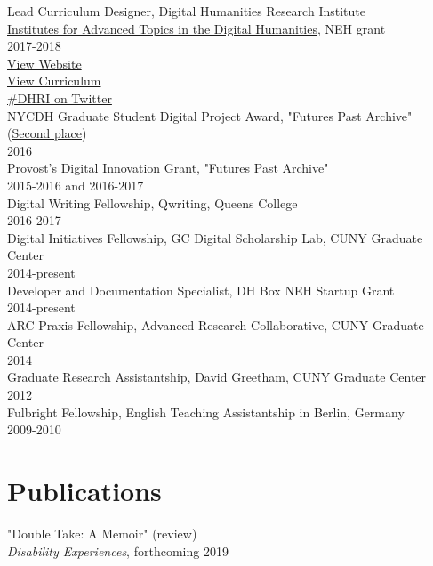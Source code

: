 \documentclass[11pt]{article}
\begin{document}
Lead Curriculum Designer, Digital Humanities Research Institute\\
\href{https://www.neh.gov/grants/odh/institutes-advanced-topics-in-the-digital-humanities}{Institutes for Advanced Topics in the Digital Humanities}, NEH grant\\
2017-2018\\
\href{http://dhinstitutes.org}{View Website}\\
\href{https://github.com/DHRI-Curriculum}{View Curriculum}\\
\href{https://twitter.com/search?q=\%2523dhri&src=tyah}{\#DHRI on Twitter}\\

NYCDH Graduate Student Digital Project Award, "Futures Past Archive" (\href{http://nycdh.org/nycdh-graduate-student-digital-project-awards-2016/}{Second place})\\
2016\\

Provost's Digital Innovation Grant, "Futures Past Archive"\\
2015-2016 and 2016-2017\\

Digital Writing Fellowship, Qwriting, Queens College\\
2016-2017\\

Digital Initiatives Fellowship, GC Digital Scholarship Lab, CUNY Graduate Center\\
2014-present\\

Developer and Documentation Specialist, DH Box NEH Startup Grant\\
2014-present\\

ARC Praxis Fellowship, Advanced Research Collaborative, CUNY Graduate Center\\
2014\\

Graduate Research Assistantship, David Greetham, CUNY Graduate Center\\
2012\\

Fulbright Fellowship, English Teaching Assistantship in Berlin, Germany\\
2009-2010\\

\section*{Publications}
\label{sec:orgheadline3}
"Double Take: A Memoir" (review)\\
\emph{Disability Experiences}, forthcoming 2019\\
\end{document}
